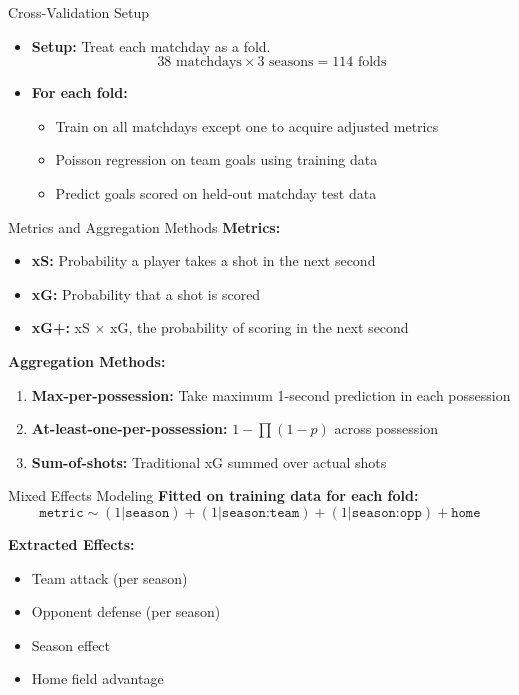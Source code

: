 \documentclass{beamer}
\begin{document}
\begin{frame}{Cross-Validation Setup}
\begin{itemize}
\item \textbf{Setup:} Treat each matchday as a fold.
$$38 \text{ matchdays} \times 3 \text{ seasons} = 114 \text{ folds}$$
\item \textbf{For each fold:}
  \begin{itemize}
  \item Train on all matchdays except one to acquire adjusted metrics
  \item Poisson regression on team goals using training data
  \item Predict goals scored on held-out matchday test data
  \end{itemize}
\end{itemize}
\end{frame}

\begin{frame}{Metrics and Aggregation Methods}
\textbf{Metrics:}
\begin{itemize}
\item \textbf{xS:} Probability a player takes a shot in the next second
\item \textbf{xG:} Probability that a shot is scored
\item \textbf{xG+:} xS $\times$ xG, the probability of scoring in the next second
\end{itemize}

\textbf{Aggregation Methods:}
\begin{enumerate}
\item \textbf{Max-per-possession:} Take maximum 1-second prediction in each possession
\item \textbf{At-least-one-per-possession:} $1 - \prod (1 - p)$ across possession
\item \textbf{Sum-of-shots:} Traditional xG summed over actual shots
\end{enumerate}
\end{frame}

\begin{frame}{Mixed Effects Modeling}
\textbf{Fitted on training data for each fold:}
$$\texttt{metric} \sim (1|\texttt{season}) + (1|\texttt{season:team}) + (1|\texttt{season:opp}) + \texttt{home}$$

\textbf{Extracted Effects:}
\begin{itemize}
\item Team attack (per season)
\item Opponent defense (per season)
\item Season effect
\item Home field advantage
\end{itemize}
\end{frame}
\end{document}
